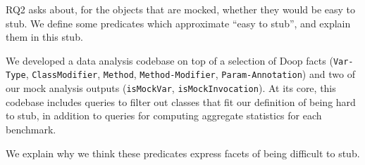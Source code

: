 RQ2 asks about, for the objects that are mocked, whether they would be easy to stub. 
We define some predicates which approximate ``easy to stub'', and explain them in this stub.



We developed a data analysis codebase on top of a selection of Doop facts (\texttt{Var-Type}, \texttt{ClassModifier}, \texttt{Method}, \texttt{Method-Modifier}, \texttt{Param-Annotation}) and two of our mock analysis outputs (\texttt{isMockVar}, \texttt{isMockInvocation}). At its core, this codebase includes queries to filter out classes that fit our definition of being hard to stub, in addition to queries for computing aggregate statistics for each benchmark.

We explain why we think these predicates express facets of being difficult to stub.








